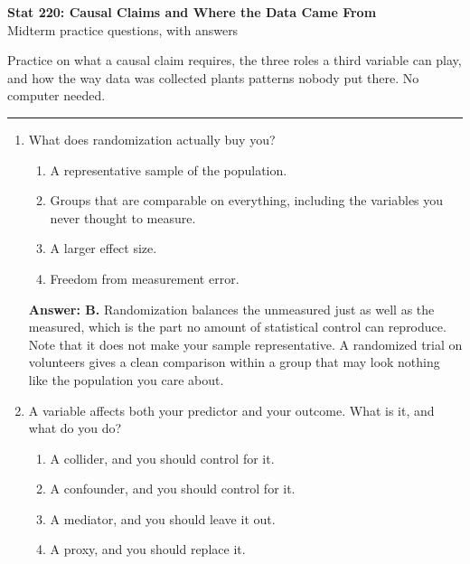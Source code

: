 \documentclass[11pt]{article}
\begin{document}
\begin{center}
{\Large\textbf{Stat 220: Causal Claims and Where the Data Came From}}\\[3pt]
{\large Midterm practice questions, with answers}\\[6pt]
\end{center}

Practice on what a causal claim requires, the three roles a third variable can play, and how
the way data was collected plants patterns nobody put there. No computer needed.

\vspace{8pt}
\hrule
\vspace{10pt}

\begin{enumerate}[itemsep=14pt]
\item What does randomization actually buy you?

\begin{enumerate}[label=\Alph*., itemsep=1pt, topsep=3pt]
  \item A representative sample of the population.
  \item Groups that are comparable on everything, including the variables you never thought to measure.
  \item A larger effect size.
  \item Freedom from measurement error.
\end{enumerate}

\vspace{2pt}
\textbf{Answer: B.} Randomization balances the unmeasured just as well as the measured, which is the part no amount of statistical control can reproduce. Note that it does not make your sample representative. A randomized trial on volunteers gives a clean comparison within a group that may look nothing like the population you care about.
\vspace{4pt}

\item A variable affects both your predictor and your outcome. What is it, and what do you do?

\begin{enumerate}[label=\Alph*., itemsep=1pt, topsep=3pt]
  \item A collider, and you should control for it.
  \item A confounder, and you should control for it.
  \item A mediator, and you should leave it out.
  \item A proxy, and you should replace it.
\end{enumerate}


\end{enumerate}
\end{document}
